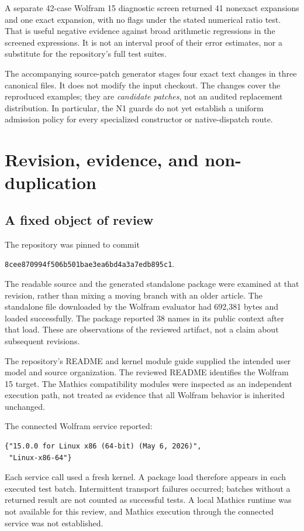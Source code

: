 \documentclass[11pt,letterpaper]{article}
\newcommand{\code}[1]{\texttt{\detokenize{#1}}}
\newcommand{\pin}{8cee870994f506b501bae3ea6bd4a3a7edb895c1}
\begin{document}
A separate 42-case Wolfram 15 diagnostic screen returned 41 nonexact expansions and one exact expansion, with no flags under the stated numerical ratio test. That is useful negative evidence against broad arithmetic regressions in the screened expressions. It is not an interval proof of their error estimates, nor a substitute for the repository's full test suites.

The accompanying source-patch generator stages four exact text changes in three canonical files. It does not modify the input checkout. The changes cover the reproduced examples; they are \emph{candidate patches}, not an audited replacement distribution. In particular, the N1 guards do not yet establish a uniform admission policy for every specialized constructor or native-dispatch route.

\section{Revision, evidence, and non-duplication}
\label{sec:scope}

\subsection{A fixed object of review}

The repository was pinned to commit
\begin{center}\small\texttt{\pin}.\end{center}
The readable source and the generated standalone package were examined at that revision, rather than mixing a moving \code{main} branch with an older article. The standalone file downloaded by the Wolfram evaluator had 692,381 bytes and loaded successfully. The package reported 38 names in its public context after that load. These are observations of the reviewed artifact, not a claim about subsequent revisions.

The repository's README and kernel module guide supplied the intended user model and source organization. The reviewed README identifies the Wolfram 15 target. The Mathics compatibility modules were inspected as an independent execution path, not treated as evidence that all Wolfram behavior is inherited unchanged.\cite{readme,kernelmap,mathicscompat}

The connected Wolfram service reported:
\begin{lstlisting}
{"15.0.0 for Linux x86 (64-bit) (May 6, 2026)",
 "Linux-x86-64"}
\end{lstlisting}
Each service call used a fresh kernel. A package load therefore appears in each executed test batch. Intermittent transport failures occurred; batches without a returned result are not counted as successful tests. A local Mathics runtime was not available for this review, and Mathics execution through the connected service was not established.
\end{document}
